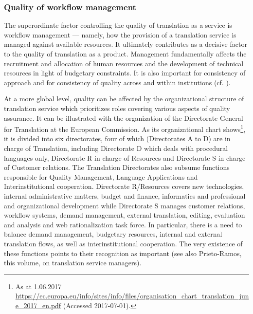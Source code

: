 \documentclass[output=paper]{langsci/langscibook}
\begin{document}
\subsubsection{Quality of workflow management}\label{sec:biel:3.2.2}

The superordinate factor controlling the quality of translation as a service is workflow management — namely, how the provision of a translation service is managed against available resources. It ultimately contributes as a decisive factor to the quality of translation as a product. Management fundamentally affects the recruitment and allocation of human resources and the development of technical resources in light of budgetary constraints. It is also important for consistency of approach and for consistency of quality across and within institutions (cf. \citealt{DruganEtAlforthcoming}). 

At a more global level, quality can be affected by the organizational structure of translation service which prioritizes roles covering various aspects of quality assurance. It can be illustrated with the organization of the Directorate{}-General for Translation at the European Commission. As its organizational chart shows\footnote{As at 1.06.2017 \url{https://ec.europa.eu/info/sites/info/files/organisation_chart_translation_june_2017_en.pdf} (Accessed 2017-07-01).}, it is divided into six directorates, four of which (Directorates A to D) are in charge of Translation, including Directorate D which deals with procedural languages only, Directorate R in charge of Resources and Directorate S in charge of Customer relations. The Translation Directorates also subsume functions responsible for Quality Management, Language Applications and Interinstitutional cooperation. Directorate R/Resources covers new technologies, internal administrative matters, budget and finance, informatics and professional and organizational development while Directorate S manages customer relations, workflow systems, demand management, external translation, editing, evaluation and analysis and web rationalization task force. In particular, there is a need to balance demand management, budgetary resources, internal and external translation flows, as well as interinstitutional cooperation. The very existence of these functions points to their recognition as important (see also Prieto-Ramos, this volume, on translation service managers).
\end{document}
